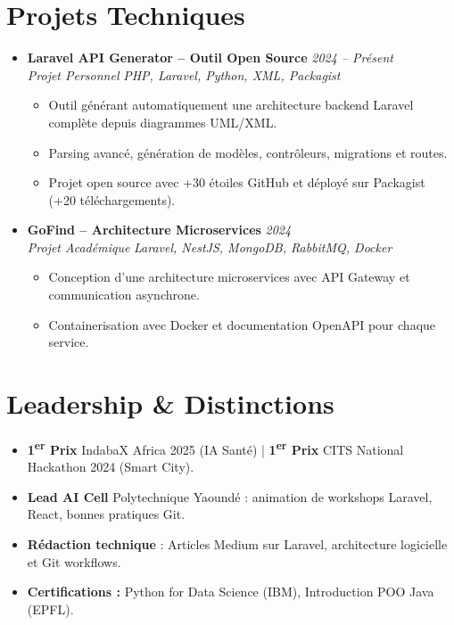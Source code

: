 \documentclass[a4paper,11pt]{article}
\begin{document}
\section{Projets Techniques}
\begin{itemize}[leftmargin=*, label={-}]

\item \textbf{Laravel API Generator -- Outil Open Source} \hfill \textit{2024 -- Présent} \\
\textit{Projet Personnel} \hfill \textit{PHP, Laravel, Python, XML, Packagist}
\vspace{-2pt}
    \begin{itemize}[leftmargin=0.4cm, nosep, label=\tiny$\bullet$]
        \item \small{Outil générant automatiquement une architecture backend Laravel complète depuis diagrammes UML/XML.}
        \item \small{Parsing avancé, génération de modèles, contrôleurs, migrations et routes.}
        \item \small{Projet open source avec +30 étoiles GitHub et déployé sur Packagist (+20 téléchargements).}
    \end{itemize}
\vspace{3pt}

\item \textbf{GoFind -- Architecture Microservices} \hfill \textit{2024} \\
\textit{Projet Académique} \hfill \textit{Laravel, NestJS, MongoDB, RabbitMQ, Docker}
\vspace{-2pt}
    \begin{itemize}[leftmargin=0.4cm, nosep, label=\tiny$\bullet$]
        \item \small{Conception d'une architecture microservices avec API Gateway et communication asynchrone.}
        \item \small{Containerisation avec Docker et documentation OpenAPI pour chaque service.}
    \end{itemize}
\vspace{3pt}


\end{itemize}

\section{Leadership \& Distinctions}
\begin{itemize}[leftmargin=*, label=\tiny$\bullet$, nosep]
    \item \small{\textbf{1\textsuperscript{er} Prix} IndabaX Africa 2025 (IA Santé) | \textbf{1\textsuperscript{er} Prix} CITS National Hackathon 2024 (Smart City).}
    \item \small{\textbf{Lead AI Cell} Polytechnique Yaoundé : animation de workshops Laravel, React, bonnes pratiques Git.}
    \item \small{\textbf{Rédaction technique} : Articles Medium sur Laravel, architecture logicielle et Git workflows.}
    \item \small{\textbf{Certifications :} Python for Data Science (IBM), Introduction POO Java (EPFL).}
\end{itemize}
\end{document}
